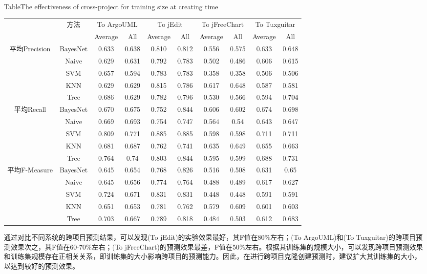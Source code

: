 \begin{table} [htbp]
{Table$\!$}{The effectiveness of cross-project for training size at creating time}
\vspace{0.5em}
\centering
\footnotesize
\begin{tabular}{cccccccccc}
\toprule[1.5pt]
~\multirow{2}{*}{指标}&\multirow{2}{*}{方法}&\multicolumn{2}{c}{To ArgoUML}&\multicolumn{2}{c}{To jEdit}&\multicolumn{2}{c}{To jFreeChart}&\multicolumn{2}{c}{To  Tuxguitar}\\
\cline{3-10}
~&~&{Average}&{All}&{Average}&{All}&{Average}&{All}&{Average}&{All}\\
\midrule[1pt]
\multirow{5}{*}{平均Precision}
&BayesNet&0.633&0.638&0.810&	0.812&0.556&0.575&0.633&0.648\\
&Naive&0.629&0.631&0.792&0.783&0.502&0.486&	0.606&0.615\\
&SVM&0.657&0.594&0.783&0.783&	0.358&0.358&0.506&	0.506\\
&KNN&0.629&0.629&0.815&0.786&	0.617&0.648&0.587&	0.581\\
&Tree&0.686&	0.629&0.782&0.796&	0.530&0.566&0.594&0.704\\
\hline
\multirow{5}{*}{平均Recall}															
&BayesNet&0.670&0.675&	0.752&0.844&	0.606&0.602&	0.674&0.698\\
&Naive&0.669&0.693&	0.754&0.747&	0.564&0.54&0.643&0.647\\
&SVM&	0.809&0.771&0.885&	0.885&0.598&0.598&0.711&0.711\\
&KNN&	0.681&0.687&0.762&0.741&0.635&0.649&0.655&	0.663\\
&Tree	&0.764&	0.74&	0.803&0.844&0.595&	0.599&0.688&0.731\\
\hline
\multirow{5}{*}{平均F-Measure}					
&BayesNet&0.645&0.654&	0.768&0.826&0.516&0.508&0.631&0.65\\
&Naive&0.645&0.656&	0.774&0.764	&0.488&	0.489	&0.617&0.627\\
&SVM&	0.724&0.671&0.831&	0.831&0.448&0.448&	0.591&0.591\\
&KNN&	0.651&0.653&0.781&	0.762&0.579	&0.609&	0.601	&0.603\\
&Tree	&0.703&	0.667&0.789&0.818&	0.484	&0.503&	0.612	&0.683\\
\bottomrule[1.5pt]
\end{tabular}
\end{table}

通过对比不同系统的跨项目预测结果，可以发现(To jEdit)的实验效果最好，其F值在80\%左右；(To ArgoUML)和(To Tuxguitar)的跨项目预测效果次之，其F值在60-70\%左右；(To jFreeChart)的预测效果最差，F值在50\%左右。根据其训练集的规模大小，可以发现跨项目预测效果和训练集规模存在正相关关系，即训练集的大小影响跨项目的预测能力。因此，在进行跨项目克隆创建预测时，建议扩大其训练集的大小，以达到较好的预测效果。%

